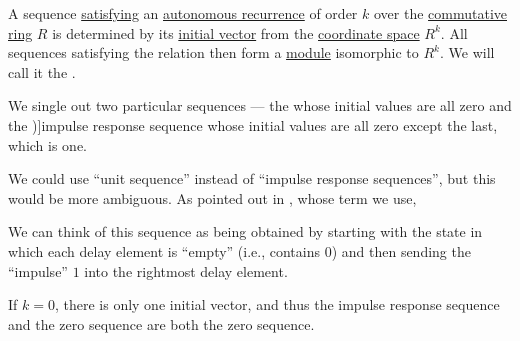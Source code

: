 \begin{definition}\label{def:recurrence_relation_space}\mimprovised
  A sequence \hyperref[def:recurrence_relation/sequence]{satisfying} an \hyperref[def:recurrence_relation]{autonomous recurrence} of order \( k \) over the \hyperref[def:ring/commutative]{commutative ring} \( R \) is determined by its \hyperref[def:recurrence_relation/state]{initial vector} from the \hyperref[def:sequence_space]{coordinate space} \( R^k \). All sequences satisfying the relation then form a \hyperref[def:module]{module} isomorphic to \( R^k \). We will call it the .

  We single out two particular sequences --- the  whose initial values are all zero and the \term[en=impulse response sequence (\cite[402]{LidlNiederreiter1997FiniteFields})]{impulse response sequence} whose initial values are all zero except the last, which is one.
\end{definition}
\begin{comments}
  \item We could use \enquote{unit sequence} instead of \enquote{impulse response sequences}, but this would be more ambiguous. As pointed out in , whose term we use,
  \begin{displayquote}
    We can think of this sequence as being obtained by starting with the state in which each delay element is \enquote{empty} (i.e., contains
\( 0 \)) and then sending the \enquote{impulse} \( 1 \) into the rightmost delay element.
  \end{displayquote}

  \item If \( k = 0 \), there is only one initial vector, and thus the impulse response sequence and the zero sequence are both the zero sequence.
\end{comments}

